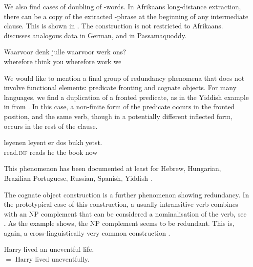 \documentclass[output=paper]{langscibook}
\begin{document}
We also find cases of doubling of -words. 
In Afrikaans long-distance extraction, there can be 
a copy of the extracted -phrase at the beginning of  any intermediate clause.
This is shown in . 
The construction is not restricted to Afrikaans. 
\citet{Hoehle:19wh} discusses analogous data in German, and \citet{Bruening:06} in Passamaquoddy. 


\vbox{
\ea
\gll 
Waarvoor denk julle waarvoor werk ons?\\
wherefore think you wherefore work we\\
\glt {}
\citep[725]{Plessis:77}\label{w-kopier}
\z 
}




\medskip%
\begin{sloppypar}
  We would like to mention a final group of redundancy phenomena that
  does not involve functional elements: predicate fronting and cognate
  objects.  For many languages, we find a duplication of a fronted
  predicate, as in the Yiddish example in  from
  \citet{Kaellgran:Prince:89}.  In this case, a non-finite form of the
  predicate occurs in the fronted position, and the same verb, though
  in a potentially different inflected form, occurs in the rest of the
  clause.
\end{sloppypar}

\ea
\gll leyenen leyent er dos bukh yetst.\\
read\textsc{.inf} reads he the book now\\
\glt {}
\citep[48]{Kaellgran:Prince:89}\label{yiddish-front}
\z 

\begin{sloppypar}
  This phenomenon has been documented at least for Hebrew, Hungarian,
  Brazilian Portuguese, Russian, Spanish, Yiddish \citep{Vicente:09}.
\end{sloppypar}

The cognate object construction is a further phenomenon showing
redundancy.  In the prototypical case of this construction, a usually
intransitive verb combines with an NP complement that can be
considered a nominalisation of the verb, see .  As the
example shows, the NP complement seems to be redundant.  This is,
again, a cross-linguistically very common construction
\citep{Jones:88,Massam:90,Mittwoch:98}.

\ea \label{ex-coc}
Harry lived an uneventful life. 
\\
$=$ Harry lived uneventfully.
\citep[89]{Jones:88}
\z 
\end{document}
